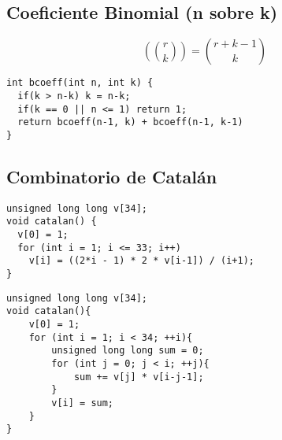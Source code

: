 \documentclass[10pt, a4, oneside]{article}
\begin{document}
\subsection{Coeficiente Binomial (n sobre k)}
\[ \left( {r \choose k} \right) = {r+k-1 \choose k} \]
\begin{verbatim}
int bcoeff(int n, int k) {
  if(k > n-k) k = n-k;
  if(k == 0 || n <= 1) return 1;
  return bcoeff(n-1, k) + bcoeff(n-1, k-1)
}
\end{verbatim}

\subsection{Combinatorio de Catalán}
\begin{verbatim}
unsigned long long v[34];
void catalan() {
  v[0] = 1;
  for (int i = 1; i <= 33; i++)
    v[i] = ((2*i - 1) * 2 * v[i-1]) / (i+1);
}
\end{verbatim}

\begin{verbatim}
unsigned long long v[34];
void catalan(){
	v[0] = 1;
	for (int i = 1; i < 34; ++i){
		unsigned long long sum = 0;
		for (int j = 0; j < i; ++j){
			sum += v[j] * v[i-j-1];
		}
		v[i] = sum;
	}
}
\end{verbatim}
\end{document}
